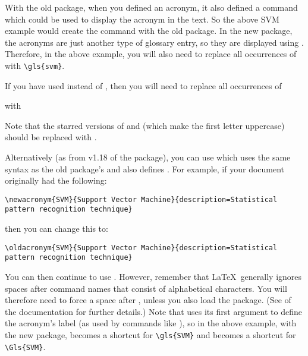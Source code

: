 \documentclass{nlctdoc}
\newenvironment{oldway}{%
  \begin{labelledbox}{\styfmt{glossary}}\ttfamily\obeylines
}{%
  \end{labelledbox}%
}
\newenvironment{newway}{%
  \begin{labelledbox}{\styfmt{glossaries}}\ttfamily\obeylines
}{%
  \end{labelledbox}%
}
\begin{document}
With the old  package, when you defined an
acronym, it also defined a command \cs{} which
could be used to display the acronym in the text. So the
above SVM example would create the command  with the old
package. In the new  package, the acronyms are just
another type of glossary entry, so they are displayed using
.  Therefore, in the above example, you will
also need to replace all occurrences of  with
\verb|\gls{svm}|.

If you have used  instead of \cs{},
then you will need to replace all occurrences of
\begin{oldway}
\end{oldway}%
with
\begin{newway}
\end{newway}%
Note that the starred versions of  and
\cs{} (which make the first letter uppercase) should
be replaced with .  

Alternatively (as from v1.18 of the  package),
you can use  which uses the same syntax as
the old  package's  and also 
defines \cs{}.
For example, if your document originally had the following:
\begin{oldway}
\begin{verbatim}
\newacronym{SVM}{Support Vector Machine}{description=Statistical
pattern recognition technique}
\end{verbatim}
\end{oldway}
then you can change this to:
\begin{newway}
\begin{verbatim}
\oldacronym{SVM}{Support Vector Machine}{description=Statistical
pattern recognition technique}
\end{verbatim}
\end{newway}
You can then continue to use \@. However, remember that
\LaTeX\ generally ignores spaces after command names that consist of
alphabetical characters. You will therefore need to force a space
after \cs{}, unless you also load the 
package. (See 
of the  documentation for further
details.) Note that  uses its first argument to
define the acronym's label (as used by commands like ), so
in the above example, with the new  package,
 becomes a shortcut for \verb|\gls{SVM}| and 
becomes a shortcut for \verb|\Gls{SVM}|.
\end{document}
